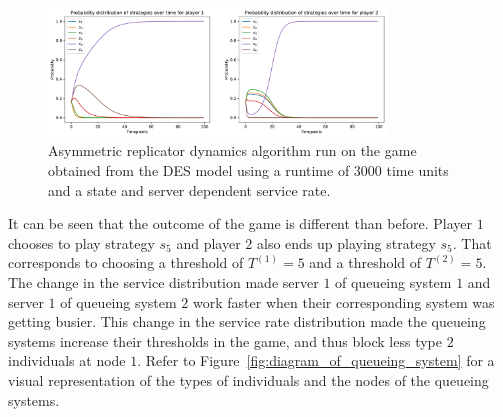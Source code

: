 \begin{figure}[H]
    \centering
    \includegraphics[width=0.8\textwidth]{chapters/06_agent_based_extension/Bin/game_model_with_des/game_server_state_dependent_3000.pdf}
    \caption{Asymmetric replicator dynamics algorithm run on the game obtained
    from the DES model using a runtime of \(3000\) time units and a state and
    server dependent service rate.}
    \label{fig:game_server_state_dependen_example}
\end{figure}

It can be seen that the outcome of the game is different than before.
Player \(1\) chooses to play strategy \(s_5\) and player \(2\) also ends up
playing strategy \(s_5\).
That corresponds to choosing a threshold of \(T^{(1)} = 5\) and a threshold of
\(T^{(2)} = 5\).
The change in the service distribution made server \(1\) of queueing system
\(1\) and server \(1\) of queueing system \(2\) work faster when their
corresponding system was getting busier.
This change in the service rate distribution made the queueing systems
increase their thresholds in the game, and thus block less type \(2\)
individuals at node \(1\).
Refer to Figure~\ref{fig:diagram_of_queueing_system} for a visual
representation of the types of individuals and the nodes of the queueing
systems. 

